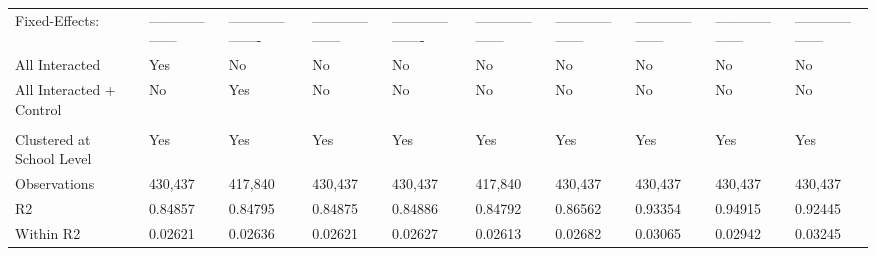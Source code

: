 \begin{table}[H]
\begin{adjustbox}{width = 1.1\textwidth,center}
\begin{tabular}{llllllllll}
 Fixed-Effects:                                                                                                                                & ------------------ & ------------------- & ------------------ & ------------------- & ------------------ & ------------------ & ------------------ & ------------------ & ------------------ \\
 All Interacted                                  & Yes                & No                  & No                 & No                  & No                 & No                 & No                 & No                 & No                 \\
 All Interacted + Control                           & No                 & Yes                 & No                 & No                  & No                 & No                 & No                 & No                 & No                 \\
 
\midrule \\
 Clustered at School Level                                                                                                                               & Yes & Yes & Yes & Yes & Yes & Yes & Yes & Yes & Yes \\
 Observations                                                                                                                                  & 430,437            & 417,840             & 430,437            & 430,437             & 417,840            & 430,437            & 430,437            & 430,437            & 430,437            \\
 R2                                                                                                                                            & 0.84857            & 0.84795             & 0.84875            & 0.84886             & 0.84792            & 0.86562            & 0.93354            & 0.94915            & 0.92445            \\
 Within R2                                                                                                                                     & 0.02621            & 0.02636             & 0.02621            & 0.02627             & 0.02613            & 0.02682            & 0.03065            & 0.02942            & 0.03245            \\
\bottomrule
\end{tabular}
\end{adjustbox}
\end{table}